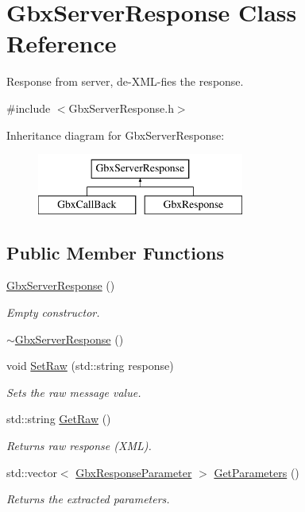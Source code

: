 \hypertarget{classGbxServerResponse}{\section{Gbx\-Server\-Response Class Reference}
\label{classGbxServerResponse}
}


Response from server, de-\/\-X\-M\-L-\/fies the response.  




{\ttfamily \#include $<$Gbx\-Server\-Response.\-h$>$}

Inheritance diagram for Gbx\-Server\-Response\-:\begin{figure}[H]
\begin{center}
\leavevmode
\includegraphics[height=2.000000cm]{classGbxServerResponse}
\end{center}
\end{figure}
\subsection*{Public Member Functions}
\begin{DoxyCompactItemize}
\item 
\hyperlink{classGbxServerResponse_a2198b6f6ca6b7da1ffd7bfa9a516d8b2}{Gbx\-Server\-Response} ()
\begin{DoxyCompactList}\small\item\em Empty constructor. \end{DoxyCompactList}\item 
\hyperlink{classGbxServerResponse_ad2a02192f5389a0fe10ea27cb24adedc}{$\sim$\-Gbx\-Server\-Response} ()
\item 
void \hyperlink{classGbxServerResponse_a178871bec787d490f69def87f0242e05}{Set\-Raw} (std\-::string response)
\begin{DoxyCompactList}\small\item\em Sets the raw message value. \end{DoxyCompactList}\item 
std\-::string \hyperlink{classGbxServerResponse_aa449d9a63899e1d1205e6ab916798ba6}{Get\-Raw} ()
\begin{DoxyCompactList}\small\item\em Returns raw response (X\-M\-L). \end{DoxyCompactList}\item 
std\-::vector$<$ \hyperlink{classGbxResponseParameter}{Gbx\-Response\-Parameter} $>$ \hyperlink{classGbxServerResponse_a6d42bdaaeff3368e1fab2984940d2a2c}{Get\-Parameters} ()
\begin{DoxyCompactList}\small\item\em Returns the extracted parameters. \end{DoxyCompactList}\end{DoxyCompactItemize}
